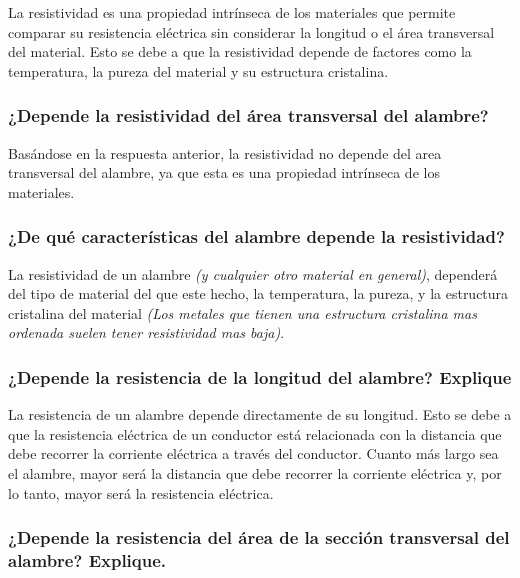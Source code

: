\documentclass[10pt]{article}
\begin{document}
\begin{multicols}{2}
	La resistividad es una propiedad intrínseca de los materiales que permite
	comparar su resistencia eléctrica sin considerar la longitud o el área
	transversal del material. Esto se debe a que la resistividad depende de
	factores como la temperatura, la pureza del material y su estructura
	cristalina.~\cite{KhanAcademy}

	\subsubsection*{¿Depende la resistividad del área transversal del alambre?}

	Basándose en la respuesta anterior, la resistividad no depende
	del area transversal del alambre, ya que esta es una propiedad intrínseca
	de los materiales.~\cite{KhanAcademy}


	\subsubsection*{¿De qué características del alambre depende la resistividad?}

	La resistividad de un alambre \textit{(y cualquier otro material en general)},
	dependerá del tipo de material del que este hecho, la temperatura,
	la pureza, y la estructura cristalina del material \textit{(Los metales
		que tienen una estructura cristalina mas ordenada suelen tener
		resistividad mas baja)}.~\cite{KhanAcademy}

	\subsubsection*{¿Depende la resistencia de la longitud del alambre? Explique}

	La resistencia de un alambre depende directamente de su longitud. Esto se
	debe a que la resistencia eléctrica de un conductor está relacionada con
	la distancia que debe recorrer la corriente eléctrica a través del
	conductor. Cuanto más largo sea el alambre, mayor será la distancia que
	debe recorrer la corriente eléctrica y, por lo tanto, mayor será la
	resistencia eléctrica.~\cite{KhanAcademy}

	\subsubsection*{¿Depende la resistencia del área de la sección transversal del alambre?
		Explique.}


\end{multicols}
\end{document}
